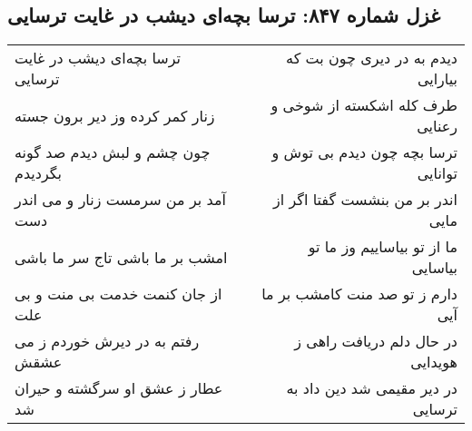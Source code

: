 \begin{center}
\section*{غزل شماره ۸۴۷: ترسا بچه‌ای دیشب در غایت ترسایی}
\label{sec:847}
\begin{longtable}{l p{0.5cm} r}
ترسا بچه‌ای دیشب در غایت ترسایی
&&
دیدم به در دیری چون بت که بیارایی
\\
زنار کمر کرده وز دیر برون جسته
&&
طرف کله اشکسته از شوخی و رعنایی
\\
چون چشم و لبش دیدم صد گونه بگردیدم
&&
ترسا بچه چون دیدم بی توش و توانایی
\\
آمد بر من سرمست زنار و می اندر دست
&&
اندر بر من بنشست گفتا اگر از مایی
\\
امشب بر ما باشی تاج سر ما باشی
&&
ما از تو بیاساییم وز ما تو بیاسایی
\\
از جان کنمت خدمت بی منت و بی علت
&&
دارم ز تو صد منت کامشب بر ما آیی
\\
رفتم به در دیرش خوردم ز می عشقش
&&
در حال دلم دریافت راهی ز هویدایی
\\
عطار ز عشق او سرگشته و حیران شد
&&
در دیر مقیمی شد دین داد به ترسایی
\\
\end{longtable}
\end{center}
